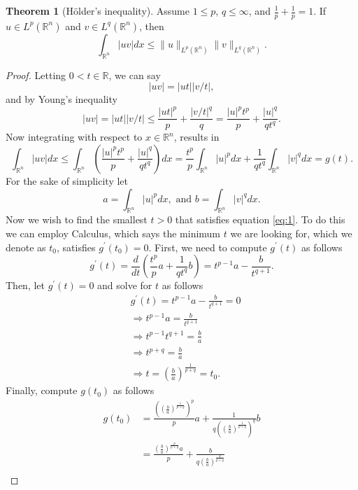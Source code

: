\documentclass[11pt]{article}
\theoremstyle{definition}
\newtheorem*{theorem}{Theorem}
\begin{document}
\begin{theorem}[H\"{o}lder's inequality]
Assume $1 \leq p$, $q \leq \infty$, and $\frac{1}{p} + \frac{1}{p} = 1$. If $u \in L^p(\mathbb{R}^n)$ and $v \in L^q(\mathbb{R}^n)$, then
	\[\int_{\mathbb{R}^n}|uv|dx \leq \|u\|_{L^p(\mathbb{R}^n)}\|v\|_{L^q(\mathbb{R}^n)}.\]
\end{theorem}
\begin{proof}
	Letting $0 < t \in \mathbb{R}$, we can say
	\[|uv| = |ut||v/t|,\]
	and by Young's inequality
	\[|uv| = |ut||v/t| \leq \frac{|ut|^p}{p} + \frac{|v/t|^q}{q} = \frac{|u|^pt^p}{p} + \frac{|u|^q}{qt^q}.\]
	Now integrating with respect to $x \in \mathbb{R}^n$, results in
	\begin{equation}
	\label{eq:1}
		\int_{\mathbb{R}^n}|uv|dx \leq  \int_{\mathbb{R}^n}\left(\frac{|u|^pt^p}{p} + \frac{|u|^q}{qt^q}\right)dx
		= \frac{t^p}{p}\int_{\mathbb{R}^n}|u|^pdx + \frac{1}{qt^q}\int_{\mathbb{R}^n}|v|^qdx = g(t).
	\end{equation}
	For the sake of simplicity let
	\[a = \int_{\mathbb{R}^n}|u|^pdx, \text{ and } b = \int_{\mathbb{R}^n}|v|^qdx.\]
	Now we wish to find the smallest $t > 0$ that satisfies equation \ref{eq:1}. To do this we can employ Calculus, which says the minimum $t$
	we are looking for, which we denote as $t_0$, satisfies $g^{\prime}(t_0) = 0$. First, we need to compute $g^{\prime}(t)$ as follows
	\[g^{\prime}(t) = \frac{d}{dt}\left(\frac{t^p}{p}a + \frac{1}{qt^q}b\right) = t^{p-1}a - \frac{b}{t^{q+1}}.\]
	Then, let $g^{\prime}(t) = 0$ and solve for $t$ as follows
	\begin{equation*}
		\begin{aligned}
			&g^{\prime}(t) = t^{p-1}a - \frac{b}{t^{q+1}} = 0 \\
			&\Rightarrow t^{p-1}a = \frac{b}{t^{q+1}} \\
			&\Rightarrow t^{p-1}t^{q+1} = \frac{b}{a} \\
			&\Rightarrow t^{p+q} = \frac{b}{a} \\
			&\Rightarrow t = \left(\frac{b}{a}\right)^{\frac{1}{p+q}} = t_0.
		\end{aligned}
	\end{equation*}
	Finally, compute $g(t_0)$ as follows
	\begin{equation*}
		\begin{aligned}
			g(t_0) &= \frac{\left(\left(\frac{b}{a}\right)^{\frac{1}{p+q}}\right)^p}{p}a + \frac{1}{q\left(\left(\frac{b}{a}\right)^{\frac{1}{p+q}}\right)^q}b \\
			       &= \frac{\left(\frac{b}{a}\right)^{\frac{p}{p+q}}a}{p} + \frac{b}{q\left(\frac{b}{a}\right)^{\frac{q}{p+q}}} \\

\end{aligned}
\end{equation*}
\end{proof}
\end{document}
